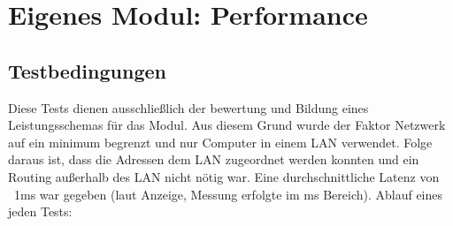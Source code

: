 \section{Eigenes Modul: Performance}
\subsection{Testbedingungen}
Diese Tests dienen ausschließlich der bewertung und Bildung eines Leistungsschemas für das Modul. Aus diesem Grund wurde der Faktor Netzwerk auf ein minimum begrenzt und nur Computer in einem LAN verwendet. Folge daraus ist, dass die Adressen dem LAN zugeordnet werden konnten und ein Routing außerhalb des LAN nicht nötig war. Eine durchschnittliche Latenz von ~1ms war gegeben (laut Anzeige, Messung erfolgte im ms Bereich). 
Ablauf eines jeden Tests:

